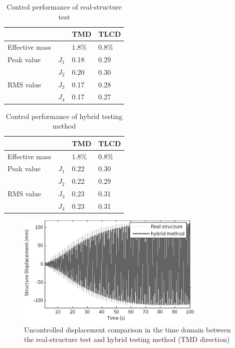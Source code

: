 \begin{table}[ht]
\centering
\begin{tabularx}{\textwidth}{@{}XXXX@{}}
\toprule[1pt]\midrule[0.3pt]
&& TMD & TLCD\\ \hline
Effective mass && $1.8\%$ & $0.8\%$\\
Peak value & $J_{1}$ & 0.18 & 0.29\\
& $J_{2}$ & 0.20 & 0.30\\
RMS value & $J_{3}$ & 0.17 & 0.28\\
& $J_{4}$ & 0.17 & 0.27\\
\bottomrule
\end{tabularx}
\caption{Control performance of real-structure test}
\label{tab:5-4}
\end{table}

\begin{table}[ht]
\centering
\begin{tabularx}{\textwidth}{@{}XXXX@{}}
\toprule[1pt]\midrule[0.3pt]
&& TMD & TLCD\\ \hline
Effective mass && $1.8\%$ & $0.8\%$\\
Peak value & $J_{1}$ & 0.22 & 0.30\\
& $J_{2}$ & 0.22 & 0.29\\
RMS value & $J_{3}$ & 0.23 & 0.31\\
& $J_{4}$ & 0.23 & 0.31\\
\bottomrule
\end{tabularx}
\caption{Control performance of hybrid testing method}
\label{tab:5-5}
\end{table}

\begin{figure}[ht]
\centering
\includegraphics[width=0.8\textwidth] {figure/5-25.eps}
\caption{Uncontrolled displacement comparison in the time domain between the real-structure test and hybrid testing method (TMD direction)}
\label{fig:5-25}
\end{figure}

